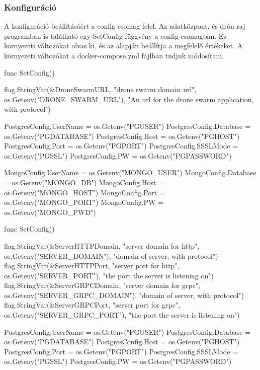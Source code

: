 
\subsubsection{Konfiguráció}
A konfiguráció beállításáért a config csomag felel.
Az adatközpont, és drón-raj programban is található egy SetConfig függvény a config csomagban.
Ez környezeti változókat olvas ki, és az alapján beállítja a megfelelő értékeket.
A környezeti változókat a docker-compose.yml fájlban tudjuk módosítani.

\begin{python}
    func SetConfig() {
        flag.StringVar(&DroneSwarmURL, "drone swarm domain url", os.Getenv("DRONE_SWARM_URL"),
        "An url for the drone swarm application, with protocol")

        PostgresConfig.UserName = os.Getenv("PGUSER")
        PostgresConfig.Database = os.Getenv("PGDATABASE")
        PostgresConfig.Host = os.Getenv("PGHOST")
        PostgresConfig.Port = os.Getenv("PGPORT")
        PostgresConfig.SSSLMode = os.Getenv("PGSSL")
        PostgresConfig.PW = os.Getenv("PGPASSWORD")

        MongoConfig.UserName = os.Getenv("MONGO_USER")
        MongoConfig.Database = os.Getenv("MONGO_DB")
        MongoConfig.Host = os.Getenv("MONGO_HOST")
        MongoConfig.Port = os.Getenv("MONGO_PORT")
        MongoConfig.PW = os.Getenv("MONGO_PWD")
    }
\end{python}

\begin{python}
    func SetConfig() {
        flag.StringVar(&ServerHTTPDomain, "server domain for http", os.Getenv("SERVER_DOMAIN"), "domain of server, with protocol")
        flag.StringVar(&ServerHTTPPort, "server port for http", os.Getenv("SERVER_PORT"), "the port the server is listening on")
        flag.StringVar(&ServerGRPCDomain, "server domain for grpc", os.Getenv("SERVER_GRPC_DOMAIN"), "domain of server, with protocol")
        flag.StringVar(&ServerGRPCPort, "server port for grpc", os.Getenv("SERVER_GRPC_PORT"), "the port the server is listening on")

        PostgresConfig.UserName = os.Getenv("PGUSER")
        PostgresConfig.Database = os.Getenv("PGDATABASE")
        PostgresConfig.Host = os.Getenv("PGHOST")
        PostgresConfig.Port = os.Getenv("PGPORT")
        PostgresConfig.SSSLMode = os.Getenv("PGSSL")
        PostgresConfig.PW = os.Getenv("PGPASSWORD")
    }
\end{python}



